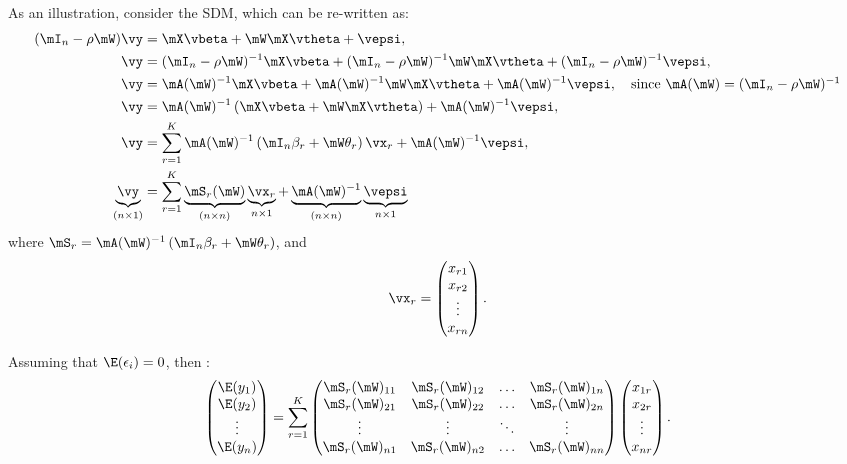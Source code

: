 \documentclass[english,12pt]{book}\usepackage[]{graphicx}\usepackage[]{xcolor}
\begin{document}
As an illustration, consider the SDM, which can be re-written as:
\begin{equation*}
\begin{aligned}
(\mI_n - \rho\mW)\vy & = \mX\vbeta + \mW\mX\vtheta + \vepsi, \\
\vy & =   (\mI_n - \rho\mW)^{-1}\mX\vbeta + (\mI_n - \rho\mW)^{-1}\mW\mX\vtheta + (\mI_n - \rho\mW)^{-1}\vepsi, \\
\vy & =   \mA(\mW)^{-1}\mX\vbeta + \mA(\mW)^{-1}\mW\mX\vtheta + \mA(\mW)^{-1}\vepsi,\quad \mbox{since $\mA(\mW) = (\mI_n - \rho\mW)^{-1}$}\\
\vy & =   \mA(\mW)^{-1}\left(\mX\vbeta + \mW\mX\vtheta\right) + \mA(\mW)^{-1}\vepsi, \\
\vy & =   \sum_{r=1}^K\mA(\mW)^{-1}\left(\mI_n\beta_r + \mW\theta_r\right)\vx_r + \mA(\mW)^{-1}\vepsi, \\
\underbrace{\vy}_{(n\times 1)} & =   \sum_{r=1}^K\underbrace{\mS_r(\mW)}_{(n\times n)}\underbrace{\vx_r}_{n\times 1} + \underbrace{\mA(\mW)^{-1}}_{(n\times n)}\underbrace{\vepsi}_{n\times 1}
\end{aligned}
\end{equation*}
%
where $\mS_r = \mA(\mW)^{-1}\left(\mI_n\beta_r + \mW\theta_r\right)$, and
\begin{equation*}
 \vx_r = \begin{pmatrix}
          x_{r1} \\
          x_{r2} \\
          \vdots \\
          x_{rn}
        \end{pmatrix}.
\end{equation*}

Assuming that $\E(\epsilon_i) = 0$, then :
\begin{equation}\label{eq:system_expected}
\begin{pmatrix}
\E(y_1) \\ \E(y_2) \\ \vdots \\ \E(y_n)
\end{pmatrix}
=
\sum_{r=1}^K\begin{pmatrix}
\mS_r(\mW)_{11} & \mS_r(\mW)_{12} & \hdots & \mS_r(\mW)_{1n} \\
\mS_r(\mW)_{21} & \mS_r(\mW)_{22} & \hdots & \mS_r(\mW)_{2n} \\
\vdots & \vdots & \ddots & \vdots \\ 
\mS_r(\mW)_{n1} & \mS_r(\mW)_{n2} & \hdots & \mS_r(\mW)_{nn} 
\end{pmatrix}
\begin{pmatrix}
x_{1r} \\ x_{2r} \\ \vdots \\ x_{nr} 
\end{pmatrix}.
\end{equation}
\end{document}

